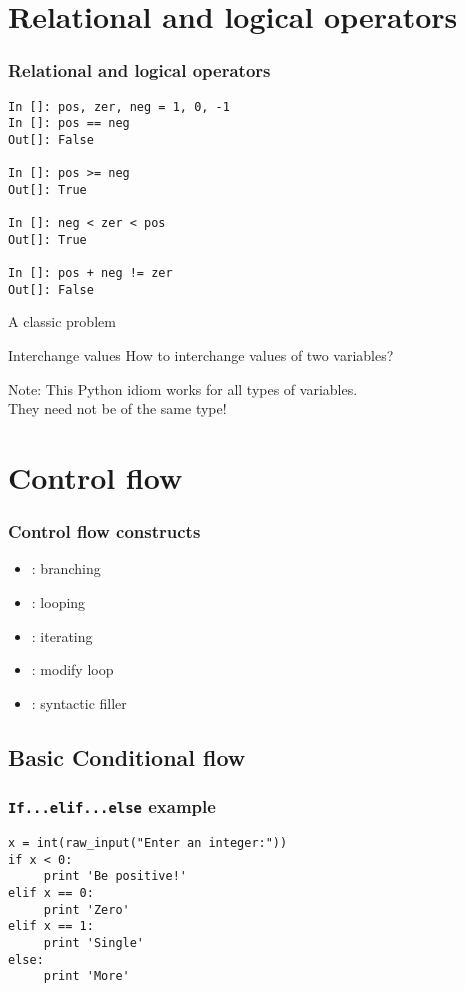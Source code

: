 \documentclass[14pt,compress]{beamer}
\newcounter{time}
\newcommand{\inctime}[1]{\addtocounter{time}{#1}{\tiny \thetime\ m}}
\newcommand{\typ}[1]{\texttt{#1}}
\newcommand{\kwrd}[1]{ \texttt{\textbf{\color{blue}{#1}}}  }
\begin{document}
\section{Relational and logical operators}
\begin{frame}[fragile]
  \frametitle{Relational and logical operators}
  \begin{lstlisting}
In []: pos, zer, neg = 1, 0, -1
In []: pos == neg
Out[]: False

In []: pos >= neg
Out[]: True

In []: neg < zer < pos
Out[]: True

In []: pos + neg != zer
Out[]: False
  \end{lstlisting}
\inctime{5}
\end{frame}

\begin{frame}
  {A classic problem}
  \begin{block}
    {Interchange values}
    How to interchange values of two variables? 
  \end{block}
  \pause
  \begin{block}{Note:}
    This Python idiom works for all types of variables.\\
They need not be of the same type!
  \end{block}
  \inctime{10}
\end{frame}

\section{Control flow}
\begin{frame}
  \frametitle{Control flow constructs}  
  \begin{itemize}
  \item \kwrd{if/elif/else}: branching
  \item \kwrd{while}: looping
  \item \kwrd{for}: iterating 
  \item \kwrd{break, continue}: modify loop 
  \item \kwrd{pass}: syntactic filler
  \end{itemize}
\end{frame}

\subsection{Basic Conditional flow}
\begin{frame}[fragile]
  \frametitle{\typ{If...elif...else} example}
\begin{lstlisting}
x = int(raw_input("Enter an integer:"))
if x < 0:
     print 'Be positive!'
elif x == 0:
     print 'Zero'
elif x == 1:
     print 'Single'
else:
     print 'More'
\end{lstlisting}
\end{frame}
\end{document}
